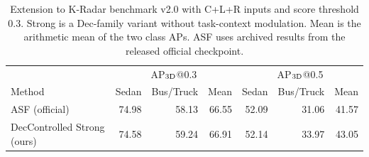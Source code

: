 \begin{table}[t]
\centering
\small
\caption{Extension to K-Radar benchmark v2.0 with C+L+R inputs and score threshold 0.3. Strong is a Dec-family variant without task-context modulation. Mean is the arithmetic mean of the two class APs. ASF uses archived results from the released official checkpoint.}
\label{tab:kradar_v2_decstrong}
\begin{tabular}{lrrrrrr}
\toprule
& \multicolumn{3}{c}{AP$_{\rm 3D}$@0.3} & \multicolumn{3}{c}{AP$_{\rm 3D}$@0.5} \\
Method & Sedan & Bus/Truck & Mean & Sedan & Bus/Truck & Mean \\
\midrule
ASF (official) & 74.98 & 58.13 & 66.55 & 52.09 & 31.06 & 41.57 \\
DecControlled Strong (ours) & 74.58 & 59.24 & 66.91 & 52.14 & 33.97 & 43.05 \\
\bottomrule
\end{tabular}
\end{table}
